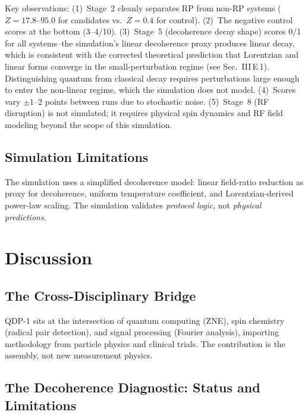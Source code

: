 \documentclass[preprint,amsmath,amssymb]{revtex4-2}
\begin{document}
Key observations: (1)~Stage~2 cleanly separates RP from non-RP systems ($Z = 17.8$--$95.0$ for candidates vs.\ $Z = 0.4$ for control). (2)~The negative control scores at the bottom (3--4/10). (3)~Stage~5 (decoherence decay shape) scores 0/1 for all systems--the simulation's linear decoherence proxy produces linear decay, which is consistent with the corrected theoretical prediction that Lorentzian and linear forms converge in the small-perturbation regime (see Sec.~III\,E\,1). Distinguishing quantum from classical decay requires perturbations large enough to enter the non-linear regime, which the simulation does not model. (4)~Scores vary $\pm 1$--$2$ points between runs due to stochastic noise. (5)~Stage~8 (RF disruption) is not simulated; it requires physical spin dynamics and RF field modeling beyond the scope of this simulation.

\subsection{Simulation Limitations}

The simulation uses a simplified decoherence model: linear field-ratio reduction as proxy for decoherence, uniform temperature coefficient, and Lorentzian-derived power-law scaling. The simulation validates \emph{protocol logic}, not \emph{physical predictions}.

\section{Discussion}

\subsection{The Cross-Disciplinary Bridge}

QDP-1 sits at the intersection of quantum computing (ZNE), spin chemistry (radical pair detection), and signal processing (Fourier analysis), importing methodology from particle physics and clinical trials. The contribution is the assembly, not new measurement physics.

\subsection{The Decoherence Diagnostic: Status and Limitations}
\end{document}
